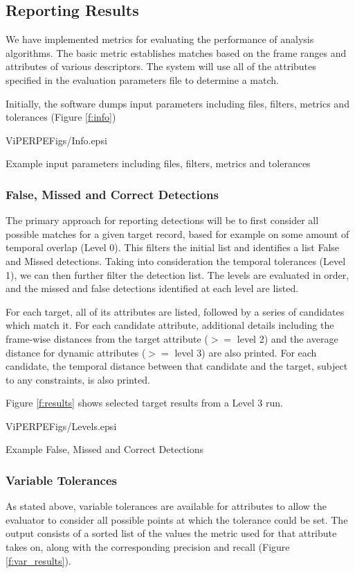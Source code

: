 \subsection{Reporting Results}
We have implemented metrics for evaluating the performance of analysis
algorithms.  The basic metric establishes matches based on the frame
ranges and attributes of various descriptors.  The system will use all
of the attributes specified in the evaluation parameters file to
determine a match.

Initially, the software dumps input parameters including files, filters, metrics and tolerances (Figure \ref{f:info})

\begin{putfig}{ViPERPEFigs/Info.epsi}
\caption{Example input parameters including files, filters, metrics and tolerances}
\label{f:info}
\end{putfig}

\subsubsection{False, Missed and Correct Detections}
The primary approach for reporting detections will be to first consider all possible matches
for a given target record, based for example on some amount of
temporal overlap (Level 0).  This filters the initial list and
identifies a list False and Missed detections.  Taking into
consideration the temporal tolerances (Level 1), we can then further
filter the detection list.  The levels are evaluated in order, and the   
missed and false detections identified at each level are listed.

For each target, all of its attributes are listed, followed by a
series of candidates which match it.  For each candidate attribute,
additional details including the frame-wise distances from the target
attribute ($>=$ level 2) and the average distance for dynamic
attributes ($>=$ level 3) are also printed.  For each candidate, the
temporal distance between that candidate and the target, subject to
any constraints, is also printed.

Figure \ref{f:results} shows selected target results from a Level 3 run.

\begin{putfig}{ViPERPEFigs/Levels.epsi}
\caption{Example False, Missed and Correct Detections}
\label{f:results}
\end{putfig}


\subsubsection{Variable Tolerances}
As stated above, variable tolerances are available for attributes to
allow the evaluator to consider all possible points at which the
tolerance could be set.  The output consists of a sorted list of the
values the metric used for that attribute takes on, along with the
corresponding precision and recall (Figure \ref{f:var_results}).



